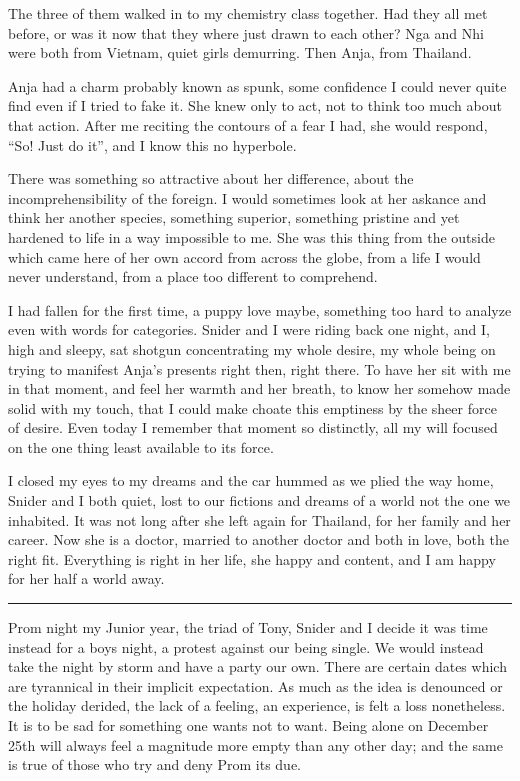 \documentclass[ebook, 10pt, openright, onecolumn]{memoir}
\newcommand*\td[1]{
  \todo[inline]{
     #1 
  }
}
\newcommand*\starbreak{\fancybreak*{\Large{* * *}}}
\newcommand*\finish{\td{ ----- Finish this section -----}}
\begin{document}
\finish{}

The three of them walked in to my chemistry class together.  Had they all met
before, or was it now that they where just drawn to each other? Nga and Nhi were
both from Vietnam, quiet girls demurring. Then Anja, from Thailand.

Anja had a charm probably known as spunk, some confidence I could never quite
find even if I tried to fake it. She knew only to act, not to think too much
about that action.  After me reciting the contours of a fear I had, she would
respond, ``So! Just do it'', and I know this no hyperbole.

There was something so attractive about her difference, about the
incomprehensibility of the foreign.  I would sometimes look at her askance and
think her another species, something superior, something pristine and yet
hardened to life in a way impossible to me.  She was this thing from the outside
which came here of her own accord from across the globe, from a life I would
never understand, from a place too different to comprehend.   

\finish



I had fallen for the first time, a puppy love maybe, something too hard to
analyze even with words for categories.  Snider and I were riding back one
night, and I, high and sleepy, sat shotgun concentrating my whole desire, my
whole being on trying to manifest Anja's presents right then, right there.  To
have her sit with me in that moment, and feel her warmth and her breath, to know
her somehow made solid with my touch, that I could make choate this emptiness by
the sheer force of desire.  Even today I remember that moment so distinctly, all
my will focused on the one thing least available to its force.

I closed my eyes to my dreams and the car hummed as we plied the way home,
Snider and I both quiet, lost to our fictions and dreams of a world not the one
we inhabited.  It was not long after she left again for Thailand, for her family
and her career.  Now she is a doctor, married to another doctor and both in
love, both the right fit.  Everything is right in her life, she happy and
content, and I am happy for her half a world away.

\starbreak

Prom night my Junior year, the triad of Tony, Snider and I decide it was time
instead for a boys night, a protest against our being single.  We would instead
take the night by storm and have a party our own.  There are certain dates which
are tyrannical in their implicit expectation.  As much as the idea is denounced
or the holiday derided, the lack of a feeling, an experience, is felt a loss
nonetheless.  It is to be sad for something one wants not to want.  Being alone
on December 25th will always feel a magnitude more empty than any other day; and
the same is true of those who try and deny Prom its due.
\end{document}
